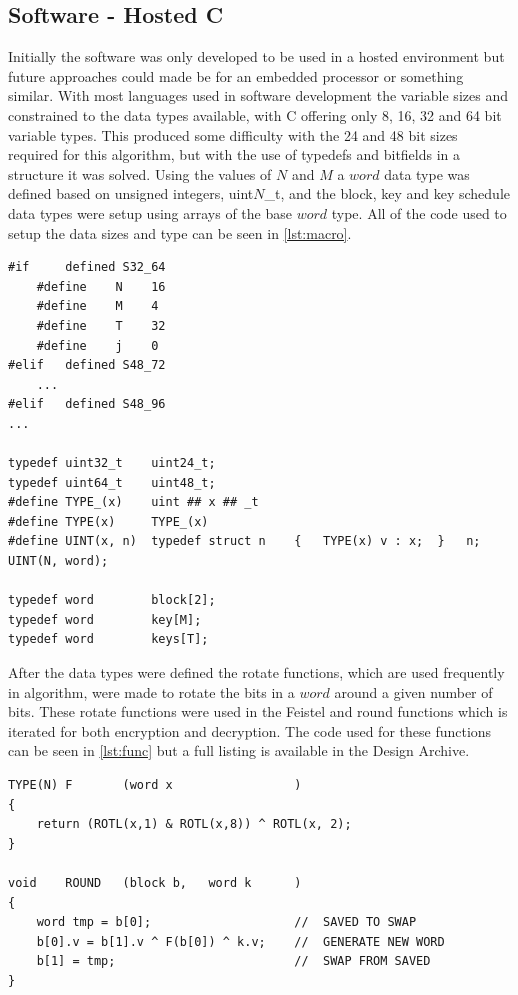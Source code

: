 \documentclass[12pt,twoside,a4paper]{report}
\begin{document}
	\subsection{Software - Hosted C}
	\label{subsection:HOSTED1}
	Initially the software was only developed to be used in a hosted environment but future approaches could made be for an embedded processor or something similar. With most languages used in software development the variable sizes and constrained to the data types available, with C offering only 8, 16, 32 and 64 bit variable types. This produced some difficulty with the 24 and 48 bit sizes required for this algorithm, but with the use of typedefs and bitfields in a structure it was solved. Using the values of $N$ and $M$ a $word$ data type was defined based on unsigned integers, uint$N$\_t, and the block, key and key schedule data types were setup using arrays of the base $word$ type. All of the code used to setup the data sizes and type can be seen in \autoref{lst:macro}.
    
	\begin{lstlisting}[label={lst:macro},caption={Macro definition of the word, block, key and key schedule types.},style=CStyle]
#if		defined	S32_64
    #define    N    16
    #define    M    4
    #define    T    32
    #define    j    0
#elif	defined S48_72
    ...
#elif	defined S48_96
...

typedef uint32_t	uint24_t;
typedef uint64_t	uint48_t;
#define TYPE_(x)	uint ## x ## _t
#define TYPE(x)		TYPE_(x)
#define UINT(x, n)	typedef struct n	{	TYPE(x) v : x;	}	n;
UINT(N, word);

typedef word 		block[2];
typedef word 		key[M];
typedef word		keys[T];
	\end{lstlisting}
    
	After the data types were defined the rotate functions, which are used frequently in algorithm, were made to rotate the bits in a $word$ around a given number of bits. These rotate functions were used in the Feistel and round functions which is iterated for both encryption and decryption. The code used for these functions can be seen in \autoref{lst:func} but a full listing is available in the Design Archive. 
	
	\begin{minipage}{\linewidth}
	\begin{lstlisting}[label={lst:func},caption={Round and Feistel functions},style=CStyle]
TYPE(N)	F		(word x					)
{
	return (ROTL(x,1) & ROTL(x,8)) ^ ROTL(x, 2);
}

void	ROUND	(block b,	word k		)
{	
	word tmp = b[0];					//	SAVED TO SWAP
	b[0].v = b[1].v ^ F(b[0]) ^ k.v;	//	GENERATE NEW WORD
	b[1] = tmp;							//	SWAP FROM SAVED
}
	\end{lstlisting}
	\end{minipage}
	
\end{document}
